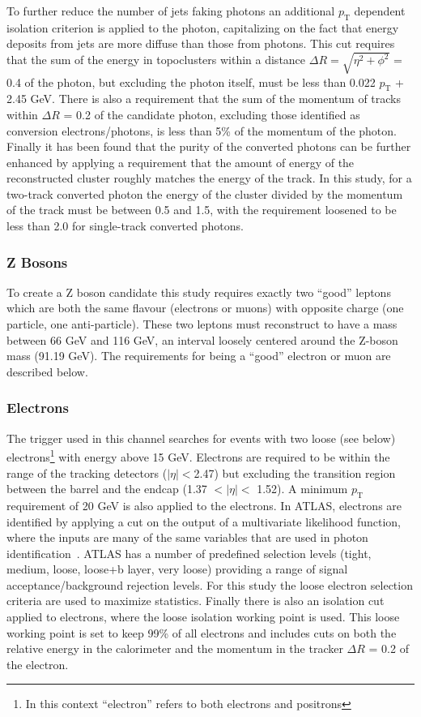 To further reduce the number of jets faking photons an additional $p_{\mathrm{T}}$ dependent isolation criterion is applied to the photon, capitalizing on the fact that energy deposits from jets are more diffuse than those from photons.  
This cut requires that the sum of the energy in topoclusters within a distance $\Delta R=\sqrt{\eta^2+\phi^2}$ = 0.4 of the photon, but excluding the photon itself, must be less than 0.022 $p_{\mathrm{T}}$ + 2.45 GeV.  
There is also a requirement that the sum of the momentum of tracks within $\Delta R$ = 0.2 of the candidate photon, excluding those identified as conversion electrons/photons, is less than 5\% of the momentum of the photon.  
Finally it has been found that the purity of the converted photons can be further enhanced by applying a requirement that the amount of energy of the reconstructed cluster roughly matches the energy of the track.  
In this study, for a two-track converted photon the energy of the cluster divided by the momentum of the track must be between 0.5 and 1.5, with the requirement loosened to be less than 2.0 for single-track converted photons.  


\subsubsection{Z Bosons}
To create a Z boson candidate this study requires exactly two ``good'' leptons which are both the same flavour (electrons or muons) with opposite charge (one particle, one anti-particle). 
These two leptons must reconstruct to have a mass between 66 GeV and 116 GeV, an interval loosely centered around the Z-boson mass (91.19 GeV).  
The requirements for being a ``good'' electron or muon are described below.  

\subsubsection{Electrons}
The trigger used in this channel searches for events with two loose (see below) electrons\footnote{In this context ``electron'' refers to both electrons and positrons} with energy above 15 GeV.  
Electrons are required to be within the range of the tracking detectors ($\mid\eta\mid<$2.47) but excluding the transition region between the barrel and the endcap (1.37 $<\mid\eta\mid<$ 1.52).  
A minimum $p_{\mathrm T}$ requirement of 20 GeV is also applied to the electrons.  
In ATLAS, electrons are identified by applying a cut on the output of a multivariate likelihood function, where the inputs are many of the same variables that are used in photon identification~\cite{ATL-PHYS-PUB-2015-041}.  
ATLAS has a number of predefined selection levels (tight, medium, loose, loose+b layer, very loose) providing a range of signal acceptance/background rejection levels.  
For this study the loose electron selection criteria are used to maximize statistics.  
Finally there is also an isolation cut applied to electrons, where the loose isolation working point is used.  
This loose working point is set to keep 99\% of all electrons and includes cuts on both the relative energy in the calorimeter and the momentum in the tracker $\Delta R$ = 0.2 of the electron.  

